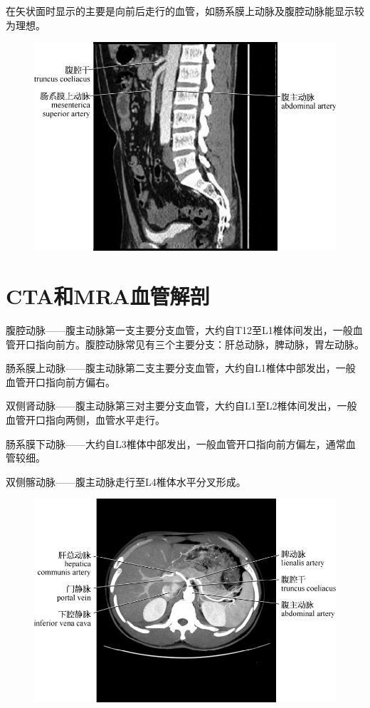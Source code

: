 在矢状面时显示的主要是向前后走行的血管，如肠系膜上动脉及腹腔动脉能显示较为理想。\begin{figure}[!htbp]
 \centering
 \includegraphics{./images/Image00198.jpg}
  \end{figure} 
 \FloatBarrier


\section{CTA和MRA血管解剖}

腹腔动脉------腹主动脉第一支主要分支血管，大约自T12至L1椎体间发出，一般血管开口指向前方。腹腔动脉常见有三个主要分支：肝总动脉，脾动脉，胃左动脉。

肠系膜上动脉------腹主动脉第二支主要分支血管，大约自L1椎体中部发出，一般血管开口指向前方偏右。

双侧肾动脉------腹主动脉第三对主要分支血管，大约自L1至L2椎体间发出，一般血管开口指向两侧，血管水平走行。

肠系膜下动脉------大约自L3椎体中部发出，一般血管开口指向前方偏左，通常血管较细。

双侧髂动脉------腹主动脉走行至L4椎体水平分叉形成。
\begin{figure}[!htbp]
 \centering
 \includegraphics{./images/Image00199.jpg}
  \end{figure} 
 \FloatBarrier

